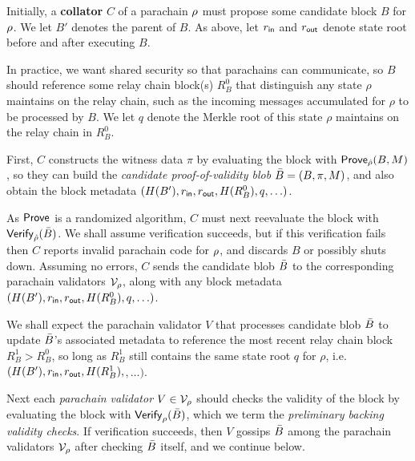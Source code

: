 \smallskip

Initially, a {\bf collator} $C$ of a parachain $\rho$ must propose some candidate block $B$ for $\rho$.  We let $B'$ denotes the parent of $B$.  As above, let $r_{\mathsf{in}}$ and $r_{\mathsf{out}}$ denote state root before and after executing $B$.  

In practice, we want shared security so that parachains can communicate, so $B$ should reference some relay chain block(s) $R^0_B$ that distinguish any state $\rho$ maintains on the relay chain, such as the incoming messages accumulated for $\rho$ to be processed by $B$.  We let $q$ denote the Merkle root of this state $\rho$ maintains on the relay chain in $R^0_B$.
 
First, $C$ constructs the witness data $\pi$ by evaluating the block with $\mathsf{Prove}_{\hat{\rho}}(B,M)$, so they can build the {\em candidate proof-of-validity blob} $\bar{B} = (B,\pi,M)$, and also obtain the block metadata $(H(B'),r_{\mathsf{in}},r_{\mathsf{out}},H(R^0_B),q,\ldots)$. 

As $\mathsf{Prove}$ is a randomized algorithm, $C$ must next reevaluate the block with $\mathsf{Verify}_{\hat{\rho}}(\bar{B})$.  We shall assume verification succeeds, but if this verification fails then $C$ reports invalid parachain code for $\rho$, and discards $B$ or possibly shuts down.  Assuming no errors, $C$ sends the candidate blob $\bar{B}$ to the corresponding parachain validators $\mathcal{V}_{\rho}$, along with any block metadata $(H(B'),r_{\mathsf{in}},r_{\mathsf{out}},H(R^0_B),q,\ldots)$. 

\smallskip

We shall expect the parachain validator $V$ that processes candidate blob $\bar{B}$ to update $\bar{B}$'s associated metadata to reference the most recent relay chain block $R^1_B > R^0_B$, so long as $R^1_B$ still contains the same state root $q$ for $\rho$,
i.e.\ $(H(B'),r_{\mathsf{in}},r_{\mathsf{out}},H(R^1_B),$$,\ldots)$.

Next each {\em parachain validator} $V \in \mathcal{V}_{\rho}$ should checks the validity of the block by evaluating the block with $\mathsf{Verify}_{\rho}(\bar{B})$, which we term the {\em preliminary backing validity checks}.  If verification succeeds, then $V$ gossips $\bar{B}$ among the parachain validators $\mathcal{V}_{\rho}$ after checking $\bar{B}$ itself, and we continue below.

